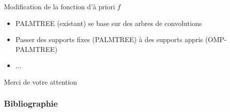 \begin{frame}{Modification de la fonction d'à priori $f$}
\begin{figure}\centering
\end{figure}
\end{frame}


\begin{frame}{}
\begin{itemize}
\item PALMTREE (existant) se base sur des arbres de convolutions
\item Passer des supports fixes (PALMTREE) à des supports appris (OMP-PALMTREE)
\item ...
\end{itemize}
\vfill
\hfill Merci de votre attention
\end{frame}

\appendix

\begin{frame}
\frametitle{Bibliographie}
\printbibliography[heading=none]
\end{frame}


